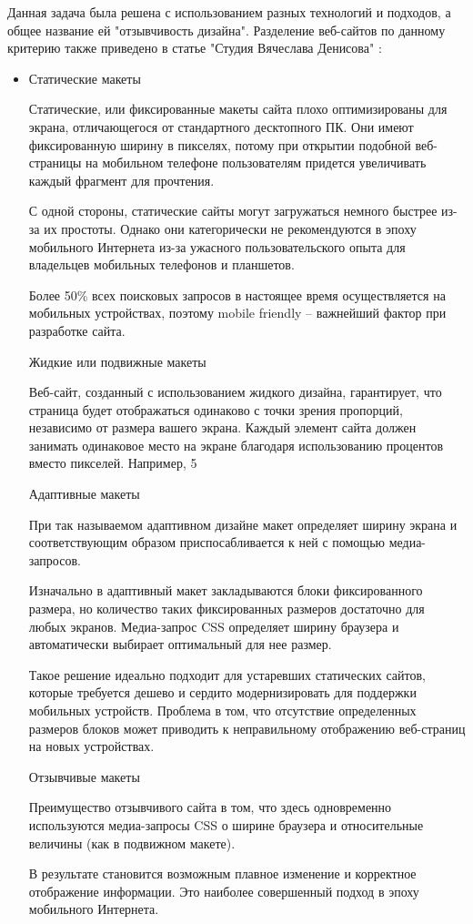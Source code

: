Данная задача была решена с использованием разных технологий и подходов, а общее название ей "отзывчивость дизайна".
Разделение веб-сайтов по данному критерию также приведено в статье "Студия Вячеслава Денисова" \cite{denisov}:
\begin{itemize}
    \item Статические макеты

    Статические, или фиксированные макеты сайта плохо оптимизированы для экрана, отличающегося от стандартного десктопного ПК. Они имеют фиксированную ширину в пикселях, потому при открытии подобной веб-страницы на мобильном телефоне пользователям придется увеличивать каждый фрагмент для прочтения.
    
    С одной стороны, статические сайты могут загружаться немного быстрее из-за их простоты. Однако они категорически не рекомендуются в эпоху мобильного Интернета из-за ужасного пользовательского опыта для владельцев мобильных телефонов и планшетов.
    
    Более 50\% всех поисковых запросов в настоящее время осуществляется на мобильных устройствах, поэтому mobile friendly – важнейший фактор при разработке сайта.
    
    Жидкие или подвижные макеты
    
    Веб-сайт, созданный с использованием жидкого дизайна, гарантирует, что страница будет отображаться одинаково с точки зрения пропорций, независимо от размера вашего экрана. Каждый элемент сайта должен занимать одинаковое место на экране благодаря использованию процентов вместо пикселей. Например, 5%
    
    Адаптивные макеты
    
    При так называемом адаптивном дизайне макет определяет ширину экрана и соответствующим образом приспосабливается к ней с помощью медиа-запросов.
    
    Изначально в адаптивный макет закладываются блоки фиксированного размера, но количество таких фиксированных размеров достаточно для любых экранов. Медиа-запрос CSS определяет ширину браузера и автоматически выбирает оптимальный для нее размер.
    
    Такое решение идеально подходит для устаревших статических сайтов, которые требуется дешево и сердито модернизировать для поддержки мобильных устройств. Проблема в том, что отсутствие определенных размеров блоков может приводить к неправильному отображению веб-страниц на новых устройствах.
    
    Отзывчивые макеты
    
    Преимущество отзывчивого сайта в том, что здесь одновременно используются медиа-запросы CSS о ширине браузера и относительные величины (как в подвижном макете).
    
    В результате становится возможным плавное изменение и корректное отображение информации. Это наиболее совершенный подход в эпоху мобильного Интернета.
\end{itemize}

